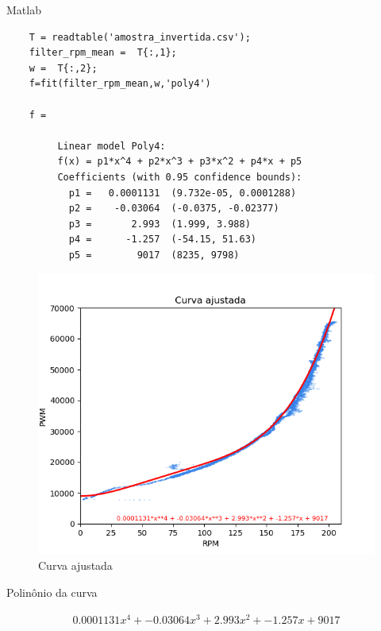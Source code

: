 Matlab
\lstset{language=Matlab}
\begin{lstlisting}
    T = readtable('amostra_invertida.csv');
    filter_rpm_mean =  T{:,1};
    w =  T{:,2};
    f=fit(filter_rpm_mean,w,'poly4')

    f = 
    
         Linear model Poly4:
         f(x) = p1*x^4 + p2*x^3 + p3*x^2 + p4*x + p5
         Coefficients (with 0.95 confidence bounds):
           p1 =   0.0001131  (9.732e-05, 0.0001288)
           p2 =    -0.03064  (-0.0375, -0.02377)
           p3 =       2.993  (1.999, 3.988)
           p4 =      -1.257  (-54.15, 51.63)
           p5 =        9017  (8235, 9798)

\end{lstlisting}

\begin{figure}[h]
	\centering
	\includegraphics{figures/curva_ajustada}
	\caption{Curva ajustada}
	\label{lof}
\end{figure}


Polinônio da curva

\begin{equation}
    \begin{split}
        0.0001131x^{4} + -0.03064x^{3} + 2.993x^{2} + -1.257x + 9017
    \end{split}
\end{equation}

